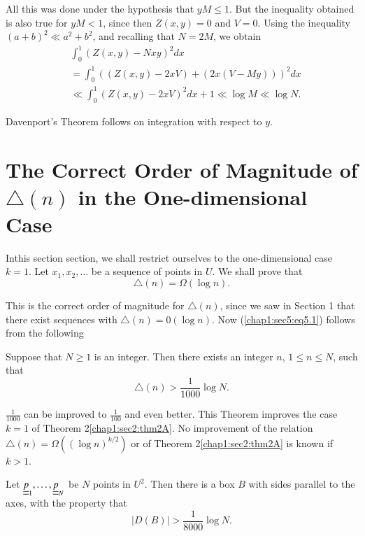 All this was done under the hypothesis that $yM \leq 1$. But the inequality obtained is also true for $yM < 1$, since then $Z(x, y) = 0$ and $V = 0$. Using the inequality $(a+b)^{2} \ll a^{2} + b^{2}$, and recalling that $N = 2M$, we obtain
\begin{align*}
& \int_{0}^{1} (Z(x, y) - Nxy)^{2} dx\\
& = \int_{0}^{1} ((Z(x, y) - 2xV) + (2x(V - My)))^{2} dx\\
& \ll \int_{0}^{1} (Z(x, y) - 2xV)^{2} dx + 1 \ll \log M \ll \log N.
\end{align*}

Davenport's Theorem follows on integration with respect to $y$.

\section[The Correct Order of Magnitude of...]{The Correct Order of
  Magnitude of $\triangle(n)$ in the One-dimensional
  Case}\label{chap1:sec5} 

In\pageoriginale this section section, we shall restrict ourselves to the one-dimensional case $k = 1$. Let $x_{1}, x_{2}, \ldots$ be a sequence of points in $U$. We shall prove that
\begin{equation*}
 \triangle(n) = \Omega (\log n).\tag{5.1}\label{chap1:sec5:eq5.1}
\end{equation*}

This is the correct order of magnitude for $\triangle (n)$, since we saw in Section 1 that there exist sequences with $\triangle(n) = 0(\log n)$. Now (\ref{chap1:sec5:eq5.1}) follows from the following
\begin{theorem}\label{chap1:sec5:thm5A}
 \cite{25} Suppose that $N \geq 1$ is an integer. Then there exists an integer $n$, $1\leq n\leq N$, such that
$$
\triangle(n) > \frac{1}{1000} \log N.
$$
\end{theorem}

 $\frac{1}{1000}$ can be improved to $\frac{1}{100}$ and even better. This Theorem improves the case $k=1$ of Theorem 2\ref{chap1:sec2:thm2A}. No improvement of the relation $\triangle(n) = \Omega ((\log n)^{k/2})$ or of Theorem 2\ref{chap1:sec2:thm2A} is known if $k>1$.

\begin{theorem}\label{chap1:sec5:thm5B}
Let $\underline{\underline{p}}_{1}, \ldots, \underline{\underline{p}}_{N}$ be $N$ points in $U^{2}$. Then there is a box $B$ with sides parallel to the axes, with the property that
$$
|D(B)| > \frac{1}{8000} \log N.
$$
\end{theorem}

